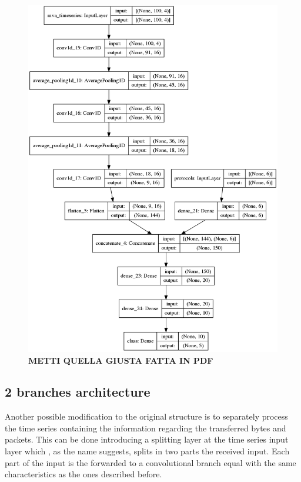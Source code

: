 \begin{figure}
    \centering
\includegraphics[height=0.95\textheight]{images/models/model_1branch.png}
\caption{\textbf{METTI QUELLA GIUSTA FATTA IN PDF}}
    \label{fig:1bnp_model}
\end{figure}

\subsection{2 branches architecture}\label{2bmodels}

Another possible modification to the original structure is to separately process the time series containing the information regarding the transferred bytes and packets. This can be done introducing a splitting layer at the time series input layer which , as the name suggests, splits in two parts the received input. Each part of the input is the forwarded to a convolutional branch equal with the same characteristics as the ones described before.

